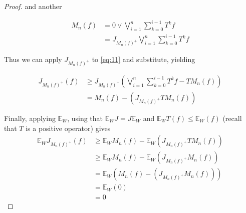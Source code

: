 \documentclass[letterpaper,10pt,oneside,onecolumn,reqno]{amsart}
\newcommand{\E}{\mathbb E}
\theoremstyle{definition}
\newcommand{\join}{\vee}
\begin{document}
\begin{proof}
  and another

  \begin{align}
    \label{eq:13}
    M_n(f) &= 0 \join \bigvee_{i=1}^n\sum\limits_{k=0}^{i-1} T^{k}f \\
    \label{eq:14}
    &= J_{M_n(f)^+}\bigvee_{i=1}^n\sum\limits_{k=0}^{i-1} T^{k}f
  \end{align}

  Thus we can apply $J_{M_n(f)^+}$ to \eqref{eq:11} and substitute,
  yielding

  \begin{align}
    \label{eq:15}
    J_{M_n(f)^+}(f) &\geq J_{M_n(f)^+}(\bigvee_{i=1}^{n}\sum\limits_{k=0}^{i-1} T^{k}f - TM_n(f)) \\
    \label{eq:16}
    &= M_n(f)-(J_{M_n(f)^+}TM_n(f))
  \end{align}

  Finally, applying $\E_W$, using that $\E_WJ=J\E_W$
  and $\E_WT(f) \leq \E_W(f) $ (recall that $T$ is a
  positive operator) gives
  \begin{align*}
    \label{eq:17}
    \E_WJ_{M_n(f)^+}(f)&\geq \E_WM_n(f)-\E_W(J_{M_n(f)^+}TM_n(f)) \\
    &\geq \E_WM_n(f)-\E_W(J_{M_n(f)^+}M_n(f)) \\
    &= \E_W(M_n(f)-(J_{M_n(f)^+}M_n(f))) \\
    &= \E_W(0) \\
    &= 0
  \end{align*}

\end{proof}

\printindex
\end{document}
